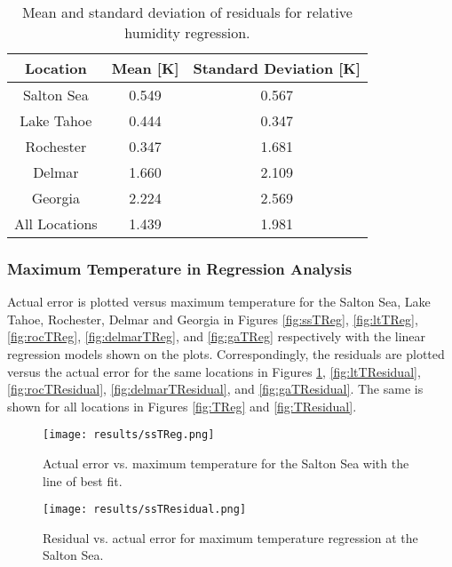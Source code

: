\documentclass{book}
\begin{document}
\begin{table}[H]
\begin{center}
\begin{tabular}{| c | c | c |}
\hline
Location & Mean [K] & Standard Deviation [K] \\ \hline
Salton Sea & 0.549 & 0.567 \\ \hline
Lake Tahoe & 0.444 & 0.347 \\ \hline
Rochester & 0.347 & 1.681 \\ \hline
Delmar & 1.660 & 2.109 \\ \hline
Georgia & 2.224 & 2.569 \\ \hline
All Locations & 1.439 & 1.981 \\ \hline
\end{tabular}
\caption{Mean and standard deviation of residuals for relative humidity regression.}
\label{tab:RHResidual}
\end{center}
\end{table}

\subsubsection{Maximum Temperature in Regression Analysis}

Actual error is plotted versus maximum temperature for the Salton Sea, Lake Tahoe, Rochester, Delmar and Georgia in Figures \ref{fig:ssTReg}, \ref{fig:ltTReg}, \ref{fig:rocTReg}, \ref{fig:delmarTReg}, and \ref{fig:gaTReg} respectively with the linear regression models shown on the plots.  Correspondingly, the residuals are plotted versus the actual error for the same locations in Figures \ref{fig:ssTResidual}, \ref{fig:ltTResidual}, \ref{fig:rocTResidual}, \ref{fig:delmarTResidual}, and \ref{fig:gaTResidual}.  The same is shown for all locations in Figures \ref{fig:TReg} and \ref{fig:TResidual}.

\begin{figure}[H]
\begin{minipage}[b]{0.47\textwidth}
\centering
\texttt{[image: results/ssTReg.png]}
\caption{Actual error vs. maximum temperature for the Salton Sea with the line of best fit.}
\label{fig:ssTReg}
\end{minipage}
\begin{minipage}[b]{0.47\textwidth}
\centering
\texttt{[image: results/ssTResidual.png]}
\caption{Residual vs. actual error for maximum temperature regression at the Salton Sea.}
\label{fig:ssTResidual}
\end{minipage}
\end{figure}
\end{document}

